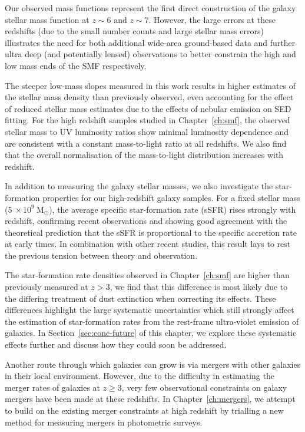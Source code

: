 Our observed mass functions represent the first direct construction of the galaxy stellar mass function at $z\sim6$ and $z\sim7$. However, the large errors at these redshifts (due to the small number counts and large stellar mass errors) illustrates the need for both additional wide-area ground-based data and further ultra deep (and potentially lensed) observations to better constrain the high and low mass ends of the SMF respectively.

The steeper low-mass slopes measured in this work results in higher estimates of the stellar mass density than previously observed, even accounting for the effect of reduced stellar mass estimates due to the effects of nebular emission on SED fitting. For the high redshift samples studied in Chapter~\ref{ch:smf}, the observed stellar mass to UV luminosity ratios show minimal luminosity dependence and are consistent with a constant mass-to-light ratio at all redshifts. We also find that the overall normalisation of the mass-to-light distribution increases with redshift.

In addition to measuring the galaxy stellar masses, we also investigate the star-formation properties for our high-redshift galaxy samples. For a fixed stellar mass ($5~\times 10^{9}~\text{M}_{\odot}$), the average specific star-formation rate (sSFR) rises strongly with redshift, confirming recent observations and showing good agreement with the theoretical prediction that the sSFR is proportional to the specific accretion rate at early times. In combination with other recent studies, this result lays to rest the previous tension between theory and observation.

The star-formation rate densities observed in Chapter~\ref{ch:smf} are higher than previously measured at $z>3$, we find that this difference is most likely due to the differing treatment of dust extinction when correcting its effects. These differences highlight the large systematic uncertainties which still strongly affect the estimation of star-formation rates from the rest-frame ultra-violet emission of galaxies. In Section~\ref{sec:conc-future} of this chapter, we explore these systematic effects further and discuss how they could soon be addressed.

Another route through which galaxies can grow is via mergers with other galaxies in their local environment. However, due to the difficulty in estimating the merger rates of galaxies at $z\geq 3$, very few observational constraints on galaxy mergers have been made at these redshifts. In Chapter~\ref{ch:mergers}, we attempt to build on the existing merger constraints at high redshift by trialling a new method for measuring mergers in photometric surveys.

